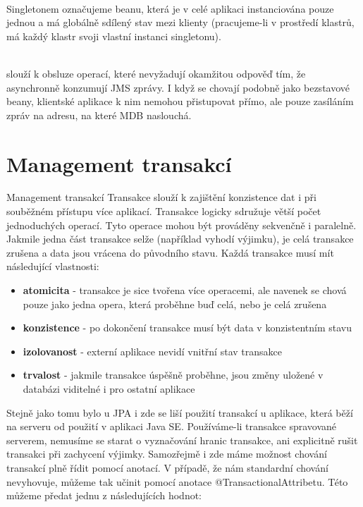 \documentclass[122pt,oneside]{fithesis}
\begin{document}
\vspace{5 mm}
\\\indent Singletonem označujeme beanu, která je v celé aplikaci instanciována pouze jednou a má globálně sdílený stav mezi klienty (pracujeme-li v prostředí klastrů, má každý klastr svoji vlastní instanci singletonu).

\vspace{5 mm}
\\\indent slouží k obsluze operací, které nevyžadují okamžitou odpověď tím, že asynchronně konzumují JMS zprávy. I když se chovají podobně jako bezstavové beany, klientské aplikace k nim nemohou přistupovat přímo, ale pouze zasíláním zpráv na adresu, na které MDB naslouchá.


\section{Management transakcí}

Management transakcí
Transakce slouží k zajištění konzistence dat i při souběžném přístupu více aplikací. Transakce logicky sdružuje větší počet jednoduchých operací. Tyto operace mohou být prováděny sekvenčně i paralelně. Jakmile jedna část transakce selže (například vyhodí výjimku), je celá transakce zrušena a data jsou vrácena do původního stavu. Každá transakce musí mít následující vlastnosti:

\begin{itemize}
  \item {\bf atomicita} - transakce je sice tvořena více operacemi, ale navenek se chová pouze jako jedna opera, která proběhne buď celá, nebo je celá zrušena
  \item {\bf konzistence} - po dokončení transakce musí být data v konzistentním stavu
  \item {\bf izolovanost} - externí aplikace nevidí vnitřní stav transakce
  \item {\bf trvalost} - jakmile transakce úspěšně proběhne, jsou změny uložené v databázi viditelné i pro ostatní aplikace
\end{itemize}

Stejně jako tomu bylo u JPA i zde se liší použití transakcí u aplikace, která běží na serveru od použití v aplikaci Java SE. Používáme-li transakce spravované serverem, nemusíme se starat o vyznačování hranic transakce, ani explicitně rušit transakci při zachycení výjimky. Samozřejmě i zde máme možnost chování transakcí plně řídit pomocí anotací. V případě, že nám standardní chování nevyhovuje, můžeme tak učinit pomocí anotace @TransactionalAttribetu. Této můžeme předat jednu z následujících hodnot:
\end{document}
